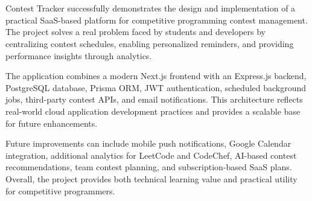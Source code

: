 \documentclass[12pt,a4paper]{report}
\begin{document}
\chapter{}
\begin{normalsize}
\setlength{\baselineskip}{1.3\baselineskip}

Contest Tracker successfully demonstrates the design and implementation of a practical SaaS-based platform for competitive programming contest management. The project solves a real problem faced by students and developers by centralizing contest schedules, enabling personalized reminders, and providing performance insights through analytics.

\vspace{0.3cm}

\noindent
The application combines a modern Next.js frontend with an Express.js backend, PostgreSQL database, Prisma ORM, JWT authentication, scheduled background jobs, third-party contest APIs, and email notifications. This architecture reflects real-world cloud application development practices and provides a scalable base for future enhancements.

\vspace{0.3cm}

\noindent
Future improvements can include mobile push notifications, Google Calendar integration, additional analytics for LeetCode and CodeChef, AI-based contest recommendations, team contest planning, and subscription-based SaaS plans. Overall, the project provides both technical learning value and practical utility for competitive programmers.

\end{normalsize}

\newpage
\end{document}
